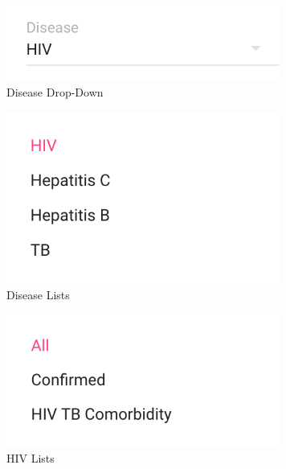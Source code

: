     
    \FloatBarrier
        \begin{figure}[h!]
            \centering
        		\includegraphics[width=9cm]{images/chapter-06/disease.png}
            	\caption{Disease Drop-Down}
        		\label{figure-disease-drop-down}
        \end{figure}
    \FloatBarrier
    
    \FloatBarrier
        \begin{figure}[h!]
            \centering
        		\includegraphics[width=9cm]{images/chapter-06/disease-lists.png}
            	\caption{Disease Lists}
        		\label{figure-disease-lists}
        \end{figure}
    \FloatBarrier
    
    \FloatBarrier
        \begin{figure}[h!]
            \centering
        		\includegraphics[width=9cm]{images/chapter-06/disease-hiv-lists.png}
            	\caption{HIV Lists}
        		\label{figure-disease-hiv-lists}
        \end{figure}
    \FloatBarrier
    
